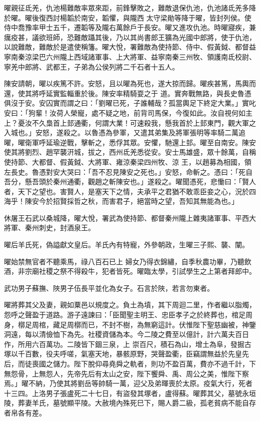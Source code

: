 \begin{pinyinscope}
 曜親征氐羌，仇池楊難敵率眾來距，前鋒擊敗之，難敵退保仇池，仇池諸氐羌多降於曜。曜後復西討楊韜於南安，韜懼，與隴西
 太守梁勛等降于曜，皆封列侯。使侍中喬豫率甲士五千，遷韜等及隴右萬餘戶于長安。曜又進攻仇池。時曜寢疾，兼癘疫甚，議欲班師，恐難敵躡其後，乃以其尚書郎王獷為光國中郎將，使于仇池，以說難敵，難敵於是遣使稱籓。曜大悅，署難敵為使持節、侍中、假黃鉞、都督益寧南秦涼梁巴六州隴上西域諸軍事、上大將軍、益寧南秦三州牧、領護南氐校尉、寧羌中郎將、武都王，子弟為公侯列將二千石者十五人。



 陳安請朝，曜以疾篤不許。安怒，且以曜為死也，遂大掠而歸。曜疾甚篤，馬輿而還，使其將呼延實監輜重於後。陳安率精騎耍之于
 道。實奔戰無路，與長史魯憑俱沒于安。安囚實而謂之曰：「劉曜已死，子誰輔哉？孤當輿足下終定大業。」實叱安曰：「狗輩！汝荷人榮寵，處不疑之地，前背司馬保，今復如此。汝自視何如主上？憂汝不久梟首上邽通衢，何謂大業！可速殺我，懸我首於上邽東門，觀大軍之入城也。」安怒，遂殺之。以魯憑為參軍，又遣其弟集及將軍張明等率騎二萬追曜，曜衛軍呼延瑜逆戰，擊斬之，悉俘其眾。安懼，馳還上邽。曜至自南安。陳安使其將劉烈、趙罕襲汧城，拔之，西州氐羌悉從安。安士馬雄盛，眾十餘萬，自稱使持節、大都督、假黃鉞、大將軍、雍涼秦梁四州牧、涼
 王，以趙募為相國，領左長史。魯憑對安大哭曰：「吾不忍見陳安之死也。」安怒，命斬之。憑曰：「死自吾分，懸吾頭於秦州通衢，觀趙之斬陳安也。」遂殺之。曜聞憑死，悲慟曰：「賢人者，天下之望也。害賢人，是塞天下之情，夫承平之君猶不敢乖臣妾之心，況於四海乎！陳安今於招賢採哲之秋，而害君子，絕當時之望，吾知其無能為也。」



 休屠王石武以桑城降，曜大悅，署武為使持節、都督秦州隴上雜夷諸軍事、平西大將軍、秦州刺史，封酒泉王。



 曜后羊氏死，偽謚獻文皇后。羊氏內有特寵，外參朝政，生曜三子熙、襲、闡。



 曜始禁無官者不聽乘馬，祿八百石已上
 婦女乃得衣錦繡，自季秋農功畢，乃聽飲酒，非宗廟社稷之祭不得殺牛，犯者皆死。曜臨太學，引試學生之上第者拜郎中。



 武功男子蘇撫、陜男子伍長平並化為女子。石言於陜，若言勿東者。



 曜將葬其父及妻，親如粟邑以規度之。負土為墳，其下周迴二里，作者繼以脂燭，怨呼之聲盈于道路。游子遠諫曰：「臣聞聖主明王、忠臣孝子之於終葬也，棺足周身，槨足周棺，藏足周槨而已，不封不樹，為無窮這計。伏惟陛下聖慈幽被，神鑒洞遠，每以清儉恤下為先。社稷資儲為本。今二陵之費至以億計，計六萬夫百日作，所用六百萬功。二陵皆下錮三泉，上
 崇百尺，積石為山，增土為阜，發掘古塚以千百數，役夫呼嗟，氣塞天地，暴骸原野，哭聲盈衢，臣竊謂無益於先皇先后，而徒喪國之儲力。陛下脫仰尋堯舜之軌者，則功不盈百萬，費亦不過千計，下無怨骨，上無怨人，先帝先后有太山之安，陛下饗舜、禹、周公之美，惟陛下察焉。」曜不納，乃使其將劉岳等帥騎一萬，迎父及弟暉喪於太原。疫氣大行，死者十三四。上洛男子張盧死二十七日，有盜發其塚者，盧得蘇。曜葬其父，墓號永垣陵，葬妻羊氏，墓號顯平陵。大赦境內殊死巳下，賜人爵二級，孤老貧病不能自存者帛各有差。




\end{pinyinscope}
